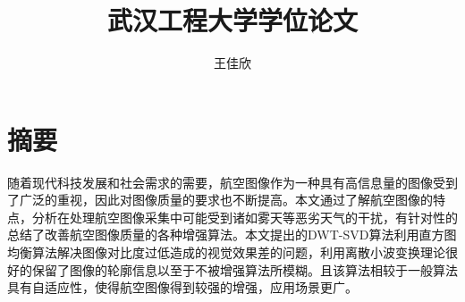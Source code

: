 \confidential{}%
\title{武汉工程大学学位论文}%
\author{王佳欣}%
\advisorsec{}%
\maketitle%
\makeenglishtitle%
\makedeclaration%
\chapter*{摘\quad 要}%
\setcounter{page}{1}%
随着现代科技发展和社会需求的需要，航空图像作为一种具有高信息量的图像受到了广泛的重视，因此对图像质量的要求也不断提高。本文通过了解航空图像的特点，分析在处理航空图像采集中可能受到诸如雾天等恶劣天气的干扰，有针对性的总结了改善航空图像质量的各种增强算法。本文提出的DWT-SVD算法利用直方图均衡算法解决图像对比度过低造成的视觉效果差的问题，利用离散小波变换理论很好的保留了图像的轮廓信息以至于不被增强算法所模糊。且该算法相较于一般算法具有自适应性，使得航空图像得到较强的增强，应用场景更广。



